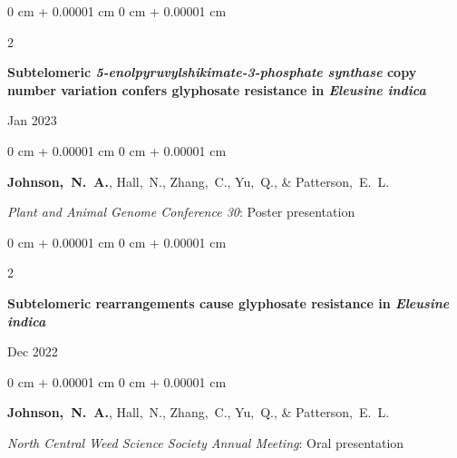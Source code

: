 \documentclass[10pt, letterpaper]{article}
\newenvironment{onecolentry}{
    \begin{adjustwidth}{
        0 cm + 0.00001 cm
    }{
        0 cm + 0.00001 cm
    }
}{
    \end{adjustwidth}
} %
\newenvironment{twocolentry}[2][]{
    \onecolentry
    \def\secondColumn{#2}
    \setcolumnwidth{\fill, 4.5 cm}
    \begin{paracol}{2}
}{
    \switchcolumn \raggedleft \secondColumn
    \end{paracol}
    \endonecolentry
} %
\begin{document}
        \begin{samepage}
            \begin{twocolentry}{
                Jan 2023
            }
                \textbf{Subtelomeric \textit{5-enolpyruvylshikimate-3-phosphate synthase} copy number variation confers glyphosate resistance in \textit{Eleusine indica}}
            \end{twocolentry}

            \vspace{0.10 cm}
            
            \begin{onecolentry}
                \mbox{\textbf{Johnson, N. A.}}, \mbox{Hall, N.}, \mbox{Zhang, C.}, \mbox{Yu, Q.}, \& \mbox{Patterson, E. L.}

                \vspace{0.10 cm}
                
                \textit{Plant and Animal Genome Conference 30}: Poster presentation
            \end{onecolentry}
        \end{samepage}   


        \vspace{0.2 cm}
        

        \begin{samepage}
            \begin{twocolentry}{
                Dec 2022
            }
                \textbf{Subtelomeric rearrangements cause glyphosate resistance in \textit{Eleusine indica}}
            \end{twocolentry}

            \vspace{0.10 cm}
            
            \begin{onecolentry}
                \mbox{\textbf{Johnson, N. A.}}, \mbox{Hall, N.}, \mbox{Zhang, C.}, \mbox{Yu, Q.}, \& \mbox{Patterson, E. L.}

                \vspace{0.10 cm}
                
                \textit{North Central Weed Science Society Annual Meeting}: Oral presentation
            \end{onecolentry}
        \end{samepage}              
\end{document}
